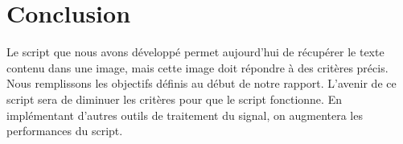 \documentclass[a4paper,12pt,titlepage]{report}
\begin{document}
	\section{Conclusion}
	Le script que nous avons développé permet aujourd'hui de récupérer le texte contenu dans une image, mais cette image doit répondre à des critères précis. Nous remplissons les objectifs définis au début de notre rapport. L'avenir de ce script sera de diminuer les critères pour que le script fonctionne. En implémentant d'autres outils de traitement du signal, on augmentera les performances du script.
	
	\listoffigures
	
	\listoftables
	
	 
	
	
\end{document}
